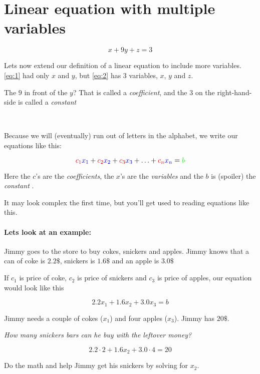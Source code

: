 \documentclass{article}
\begin{document}
\section{Linear equation with multiple variables}

\begin{equation} \label{eq:2}
x + 9y + z = 3
\end{equation}

Lets now extend our definition of a linear equation to include more variables. \eqref{eq:1} had only $x$ and $y$, but \eqref{eq:2} has 3 variables, $x$, $y$ and $z$. 

The $9$ in front of the $y$? That is called a \textit{coefficient}, and the $3$ on the right-hand-side is called a \textit{constant}

\

Because we will (eventually) run out of letters in the alphabet, we write our equations like this:

\[
\color{red}c_1\color{blue}x_1\color{black} + \color{red}c_2\color{blue}x_2\color{black} + \color{red}c_3\color{blue}x_3\color{black} + \dots\color{black} + \color{red}c_n\color{blue}x_n\color{black} = \color{green} b \color{black}
\]

Here the $c$'s are the \color{red} \textit{coefficients}\color{black}, the $x$'s are the \color{blue}  \textit{variables} \color{black}  and the $b$ is (spoiler) the \color{green} \textit{constant} \color{black} . 

It may look complex the first time, but you'll get used to reading equations like this.

\paragraph{Lets look at an example:}

Jimmy goes to the store to buy cokes, snickers and apples. Jimmy knows that a can of coke is $2.2\$$, snickers is $1.6\$$ and an apple is $3.0\$$

If $c_1$ is price of coke, $c_2$ is price of snickers and $c_3$ is price of apples, our equation would look like this

\[
2.2x_1 + 1.6x_2 + 3.0x_3 = b
\]

Jimmy needs a couple of cokes ($x_1$) and four apples ($x_3$). Jimmy has $20\$$.

\textit{How many snickers bars can he buy with the leftover money?}

\[
2.2\cdot 2 + 1.6x_2 + 3.0\cdot 4 = 20
\]

Do the math and help Jimmy get his snickers by solving for $x_2$. 
\end{document}
